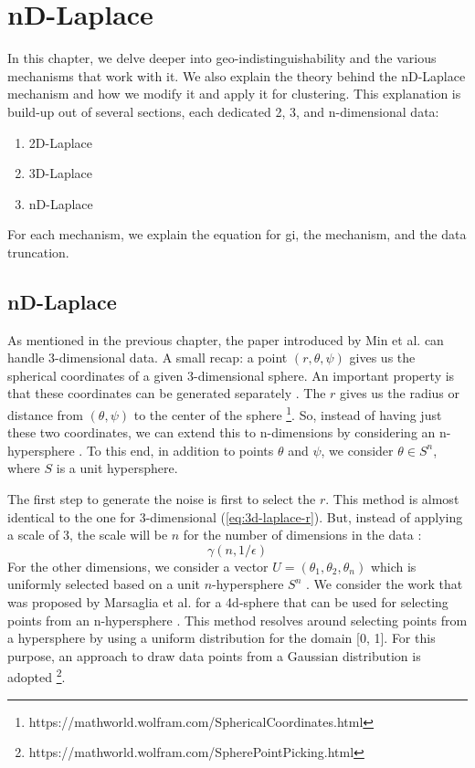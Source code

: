 \chapter{nD-Laplace}
In this chapter, we delve deeper into geo-indistinguishability and the various mechanisms that work with it.
We also explain the theory behind the nD-Laplace mechanism and how we modify it and apply it for clustering.
This explanation is build-up out of several sections, each dedicated 2, 3, and n-dimensional data:
\begin{enumerate}
  \item 2D-Laplace
  \item 3D-Laplace
  \item nD-Laplace
\end{enumerate}
For each mechanism, we explain the equation for \gls{gi}, the mechanism, and the data truncation.



\newpage
\section{nD-Laplace}
As mentioned in the previous chapter, the paper introduced by Min et al. can handle 3-dimensional data.
A small recap: a point $(r, \theta, \psi)$ gives us the spherical coordinates of a given 3-dimensional sphere.
An important property is that these coordinates can be generated separately \citep{DBLP:journals/corr/abs-1212-1984, 9646489}.
The $r$ gives us the radius or distance from $(\theta, \psi)$ to the center of the sphere \footnote{https://mathworld.wolfram.com/SphericalCoordinates.html}.
So, instead of having just these two coordinates, we can extend this to n-dimensions by considering an n-hypersphere \citep{fernandes_generalised_2019, 9646489}.
To this end, in addition to points $\theta$ and $\psi$, we consider $\theta \in S^n$, where $S$ is a unit hypersphere.

The first step to generate the noise is first to select the $r$.
This method is almost identical to the one for 3-dimensional (\ref{eq:3d-laplace-r}).
But, instead of applying a scale of 3, the scale will be $n$ for the number of dimensions in the data \citep{fernandes_generalised_2019}:
\begin{equation}
  \gamma(n, 1/\epsilon)
  \label{eq:nd-laplace-r}
\end{equation}
For the other dimensions, we consider a vector $U = (\theta_1, \theta_2, \theta_n)$ which is uniformly selected based on a unit $n$-hypersphere $S^n$ \citep{fernandes_generalised_2019}.
We consider the work that was proposed by Marsaglia et al. for a 4d-sphere that can be used for selecting points from an n-hypersphere \citep{marsaglia_choosing_1972}.
This method resolves around selecting points from a hypersphere by using a uniform distribution for the domain [0, 1].
For this purpose, an approach to draw data points from a Gaussian distribution is adopted \footnote{https://mathworld.wolfram.com/SpherePointPicking.html}.

